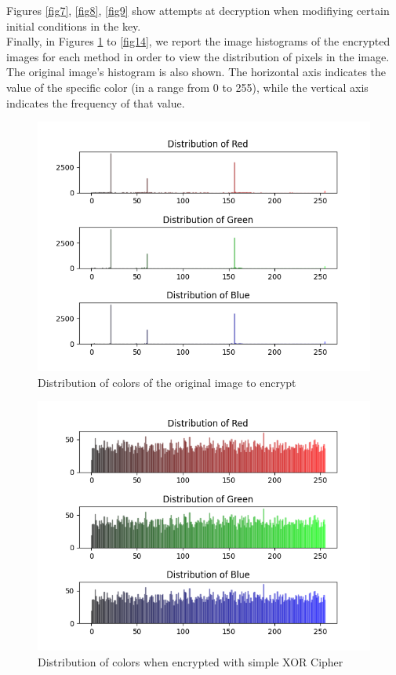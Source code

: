 \documentclass[10pt]{article}
\begin{document}
	Figures \ref{fig7}, \ref{fig8}, \ref{fig9} show attempts at decryption when modifiying certain initial conditions in the key.\\
	
	
	Finally, in Figures \ref{fig10} to \ref{fig14}, we report the image histograms of the encrypted images for each method in order to view the distribution of pixels in the image. The original image's histogram is also shown. The horizontal axis indicates the value of the specific color (in a range from 0 to 255), while the vertical axis indicates the frequency of that value.
	
	
	\begin{figure}[htbp]
		\centering
		\includegraphics[width=0.95\columnwidth]{original_histogram.png}
		\caption{Distribution of colors of the original image to encrypt}
		\label{fig10}
	\end{figure}
	
	\begin{figure}[htbp]
		\centering
		\includegraphics[width=0.95\columnwidth]{SimpleDinoEncrypted_histogram.png}
		\caption{Distribution of colors when encrypted with simple XOR Cipher}
		\label{fig11}
	\end{figure}
	
\end{document}

